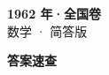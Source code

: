 \documentclass[zihao=-4, a4paper]{ctexart}
\begin{document}
\begin{center}
  {\Large\bfseries 1962 年·全国卷}\\[4pt]
  {\large 数学 · 简答版}
\end{center}
\medskip
{}

\clearpage
{}
\begin{center}{\Large\bfseries 答案速查}\end{center}
\medskip

\end{document}
